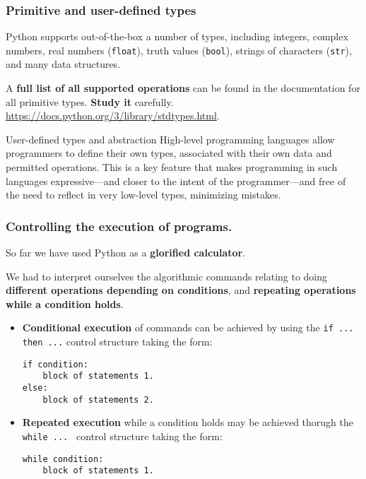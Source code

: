 \documentclass{beamer} %
\newcommand\emc[1]{\textcolor{midred}{\textbf{#1}}}
\begin{document}
\begin{frame}
\frametitle{Primitive and user-defined types} 

Python supports out-of-the-box a number of types, including integers, complex numbers, real numbers (\texttt{float}), truth values (\texttt{bool}), strings of characters (\texttt{str}), and many data structures.

\vspace{5mm}
A \emc{full list of all supported operations} can be found in the documentation for all primitive types. \emc{Study it} carefully. \url{https://docs.python.org/3/library/stdtypes.html}.


\begin{block}{User-defined types and abstraction}
High-level programming languages allow programmers to define their own types, associated with their own data and permitted operations. This is a key feature that makes programming in such languages expressive---and closer to the intent of the programmer---and free of the need to reflect in very low-level types, minimizing mistakes.
\end{block}

\end{frame}

\begin{frame}[fragile]
\frametitle{Controlling the execution of programs.} 

So far we have used Python as a \emc{glorified calculator}. 

\vspace{2mm}
We had to interpret ourselves the algorithmic commands relating to doing \emc{different operations depending on conditions}, and \emc{repeating operations while a condition holds}.

\vspace{2mm}
\begin{itemize}
	\item \emc{Conditional execution} of commands can be achieved by using the \texttt{if ... then ...} control structure taking the form:
\begin{Verbatim}[fontsize=\scriptsize]
if condition:
    block of statements 1.
else:
    block of statements 2.
\end{Verbatim}

	\item \emc{Repeated execution} while a condition holds may be achieved thorugh the \texttt{while ... } control structure taking the form:
\begin{Verbatim}[fontsize=\scriptsize]
while condition:
    block of statements 1.
\end{Verbatim}

\end{itemize}

\end{frame}
\end{document}
